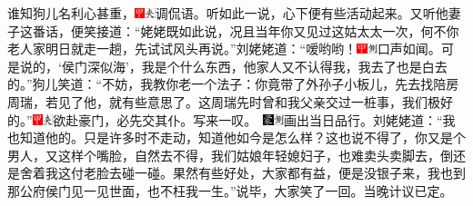 谁知狗儿名利心甚重，{\includegraphics[width=3mm]{../Images/00002}\includegraphics[width=3mm]{../Images/00012}\footnotesize \kaishu 调侃语。}听如此一说，心下便有些活动起来。又听他妻子这番话，便笑接道：``姥姥既如此说，况且当年你又见过这姑太太一次，何不你老人家明日就走一趟，先试试风头再说。''刘姥姥道：``嗳哟哟！{\includegraphics[width=3mm]{../Images/00002}\includegraphics[width=3mm]{../Images/00011}\footnotesize \kaishu 口声如闻。}可是说的，`侯门深似海'，我是个什么东西，他家人又不认得我，我去了也是白去的。''狗儿笑道：``不妨，我教你老一个法子：你竟带了外孙子小板儿，先去找陪房周瑞，若见了他，就有些意思了。这周瑞先时曾和我父亲交过一桩事，我们极好的。''{{\includegraphics[width=3mm]{../Images/00002}\includegraphics[width=3mm]{../Images/00012}\footnotesize \kaishu 欲赴豪门，必先交其仆。写来一叹。　}\includegraphics[width=3mm]{../Images/00006}\includegraphics[width=3mm]{../Images/00011}\footnotesize \kaishu 画出当日品行。}刘姥姥道：``我也知道他的。只是许多时不走动，知道他如今是怎么样？这也说不得了，你又是个男人，又这样个嘴脸，自然去不得，我们姑娘年轻媳妇子，也难卖头卖脚去，倒还是舍着我这付老脸去碰一碰。果然有些好处，大家都有益，便是没银子来，我也到那公府侯门见一见世面，也不枉我一生。''说毕，大家笑了一回。当晚计议已定。

